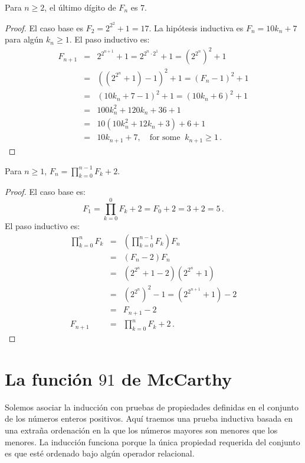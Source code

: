 \begin{theorem}
Para $n\geq 2$, el último dígito de $F_n$ es $7$.
\end{theorem}
\begin{proof}
El caso base es $F_2=2^{2^2}+1=17$.
La hipótesis inductiva es $F_n=10k_n+7$ para algún $k_n\geq 1$. El paso inductivo es:
\begin{eqnarray*}
F_{n+1}&=&2^{2^{n+1}}+1=2^{2^{n}\cdot 2^1}+1=\left(2^{2^{n}}\right)^2+1\\
&=&\left(\left(2^{2^{n}}+1\right)-1\right)^2+1=(F_n-1)^2+1\\
&=&(10k_n+7-1)^2+1=(10k_n+6)^2+1\\
&=&100k_n^2+120k_n+36+1\\
&=&10(10k_n^2+12k_n+3)+6+1\\
&=&10k_{n+1}+7,\quad \textrm{for some} \;\;k_{n+1}\geq 1\,.
\end{eqnarray*}
\end{proof}

\begin{theorem}
Para $n\geq 1$, $\displaystyle F_n = \prod_{k=0}^{n-1} F_k + 2$.
\end{theorem}
\begin{proof}
El caso base es:
\[
F_1=\prod_{k=0}^{0} F_k + 2=F_0+2=3+2=5\,.
\]
El paso inductivo es:
\begin{eqnarray*}
\prod_{k=0}^{n}F_k&=&\left(\prod_{k=0}^{n-1}F_k\right) F_n \\
&=& (F_n-2)F_n\\
&=& \left(2^{2^n}+1-2\right)\left(2^{2^n}+1\right)\\
&=& \left(2^{2^{n}}\right)^2-1= \left(2^{2^{n+1}}+1\right)-2\\
&=&F_{n+1}-2\\
F_{n+1}&=&\prod_{k=0}^{n}F_k + 2\,.
\end{eqnarray*}
\end{proof}


\section{La función $91$ de McCarthy}\label{s.induction-mccarthy}

Solemos asociar la inducción con pruebas de propiedades definidas en el conjunto de los números enteros positivos. Aquí traemos una prueba inductiva basada en una extraña ordenación en la que los números mayores son menores que los menores. La inducción funciona porque la única propiedad requerida del conjunto es que esté ordenado bajo algún operador relacional.

